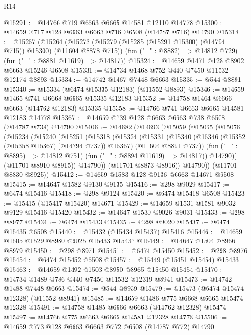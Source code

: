 \begin{lexlean}{R14}
\begin{coremodule}
@15291 := @14766 @719 @6663 @6665 @14581 @12110 @14778
@15300 := @14659 @717 @128 @6663 @6663 @716 @6508 (@14787 @716) @14790
@15318 := @15257
    (@15264
      (@15273 (@15279 (@15285 (@15291 @15300) (@14794 @715)) @15300) (@11604 @8878 @715))
      (fun ("_" : @8882) => @14812 @729)
      (fun ("_" : @8881 @11619) => @14817))
@15324 := @14659 @1471 @128 @8902 @6663 @15246 @6508
@15331 := @14734 @1468 @752 @440 @7450 @11532 @12174 @8893
@15334 := @14742 @1467 @7448 @6663
@15335 := @544 @8891
@15340 := @15334 (@6474 @15335 @12183) (@11552 @8893)
@15346 := @14659 @1465 @741 @6668 @6665 @15335 @12183
@15352 := @14758 @1464 @6666 @6663 (@14762 @12183) @15335
@15358 := @14766 @741 @6663 @6665 @14581 @12183 @14778
@15367 := @14659 @739 @128 @6663 @6663 @738 @6508 (@14787 @738) @14790
@15406 := @14682
    (@14693
      (@15059
        (@15065
          (@15076
            (@15234
              (@15240
                (@15251
                  (@15318
                    (@15324
                      (@15331
                        (@15340
                          (@15346 (@15352 (@15358 @15367) (@14794 @737)) @15367)
                          (@11604 @8891 @737))
                        (fun ("_" : @8895) => @14812 @751)
                        (fun ("_" : @8894 @11619) => @14817))
                      @14790))
                  (@11701 @8910 @8915))
                @14790))
            (@11701 @8873 @8916))
          @14790))
      (@11701 @8830 @8925))
@15412 := @14659 @1583 @128 @9136 @6663 @14671 @6508
@15415 := @14647 @1582 @9130 @9135
@15416 := @298 @9029
@15417 := @6474 @15416
@15418 := @298 @9124
@15420 := @6474 @15418 @6508
@15423 := @15415 (@15417 @15420) @14671
@15429 := @14659 @1531 @1581 @9032 @9129 @15416 @15420
@15432 := @14647 @1530 @9026 @9031
@15433 := @298 @8977
@15434 := @6474 @15433
@15435 := @298 @9020
@15437 := @6474 @15435 @6508
@15440 := @15432 (@15434 @15437) @15416
@15446 := @14659 @1505 @1529 @8980 @9025 @15433 @15437
@15449 := @14647 @1504 @8966 @8979
@15450 := @298 @8971
@15451 := @6474 @15450
@15452 := @298 @8976
@15454 := @6474 @15452 @6508
@15457 := @15449 (@15451 @15454) @15433
@15463 := @14659 @1492 @1503 @8950 @8965 @15450 @15454
@15470 := @14734 @1489 @786 @440 @7450 @11532 @12319 @8941
@15473 := @14742 @1488 @7448 @6663
@15474 := @544 @8939
@15479 := @15473 (@6474 @15474 @12328) (@11552 @8941)
@15485 := @14659 @1486 @775 @6668 @6665 @15474 @12328
@15491 := @14758 @1485 @6666 @6663 (@14762 @12328) @15474
@15497 := @14766 @775 @6663 @6665 @14581 @12328 @14778
@15506 := @14659 @773 @128 @6663 @6663 @772 @6508 (@14787 @772) @14790

\end{coremodule}
\end{lexlean}
